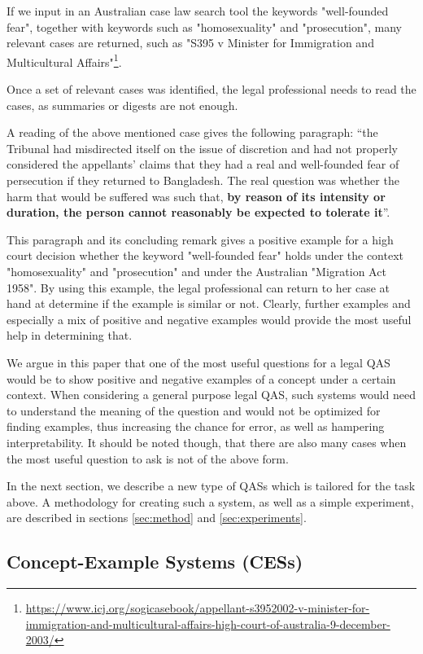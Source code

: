 If we input in an Australian case law search tool the keywords "well-founded fear", together with keywords such as "homosexuality" and "prosecution", many relevant cases are returned, such as "S395 v Minister for Immigration and Multicultural Affairs"\footnote{\url{https://www.icj.org/sogicasebook/appellant-s3952002-v-minister-for-immigration-and-multicultural-affairs-high-court-of-australia-9-december-2003/}}. 

Once a set of relevant cases was identified, the legal professional needs to read the cases, as summaries or digests are not enough.

A reading of the above mentioned case gives the following paragraph: ``the Tribunal had misdirected itself on the issue of discretion and had not properly considered the appellants’ claims that they had a real and well-founded fear of persecution if they returned to Bangladesh. The real question was whether the harm that would be suffered was such that, {\bf by reason of its intensity or duration, the person cannot reasonably be expected to tolerate it}''.

This paragraph and its concluding remark gives a positive example for a high court decision whether the keyword "well-founded fear" holds under the context "homosexuality" and "prosecution" and under the Australian "Migration Act 1958". By using this example, the legal professional can return to her case at hand at determine if the example is similar or not. Clearly, further examples and especially a mix of positive and negative examples would provide the most useful help in determining that.

We argue in this paper that one of the most useful questions for a legal QAS would be to show positive and negative examples of a concept under a certain context. When considering a general purpose legal QAS, such systems would need to understand the meaning of the question and would not be optimized for finding examples, thus increasing the chance for error, as well as hampering interpretability. It should be noted though, that there are also many cases when the most useful question to ask is not of the above form.

In the next section, we describe a new type of QASs which is tailored for the task above. A methodology for creating such a system, as well as a simple experiment, are described in sections \ref{sec:method} and \ref{sec:experiments}.

\subsection{Concept-Example Systems (CESs)}

